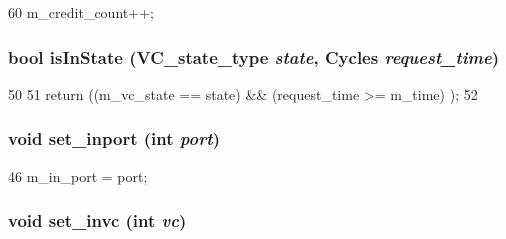 \begin{DoxyCode}
60 { m_credit_count++; }
\end{DoxyCode}
\hypertarget{classOutVcState__d_ac76622b1411a4bb60ccc5ed355bc9645}{
\subsubsection[{isInState}]{\setlength{\rightskip}{0pt plus 5cm}bool isInState ({\bf VC\_\-state\_\-type} {\em state}, \/  {\bf Cycles} {\em request\_\-time})}}
\label{classOutVcState__d_ac76622b1411a4bb60ccc5ed355bc9645}



\begin{DoxyCode}
50     {
51         return ((m_vc_state == state) && (request_time >= m_time) );
52     }
\end{DoxyCode}
\hypertarget{classOutVcState__d_ae97206c3cb5b279e0450ec99e6621fb6}{
\subsubsection[{set\_\-inport}]{\setlength{\rightskip}{0pt plus 5cm}void set\_\-inport (int {\em port})}}
\label{classOutVcState__d_ae97206c3cb5b279e0450ec99e6621fb6}



\begin{DoxyCode}
46 { m_in_port = port; }
\end{DoxyCode}
\hypertarget{classOutVcState__d_af2d22add988a75ebb297580c3e1d8df2}{
\subsubsection[{set\_\-invc}]{\setlength{\rightskip}{0pt plus 5cm}void set\_\-invc (int {\em vc})}}
\label{classOutVcState__d_af2d22add988a75ebb297580c3e1d8df2}



